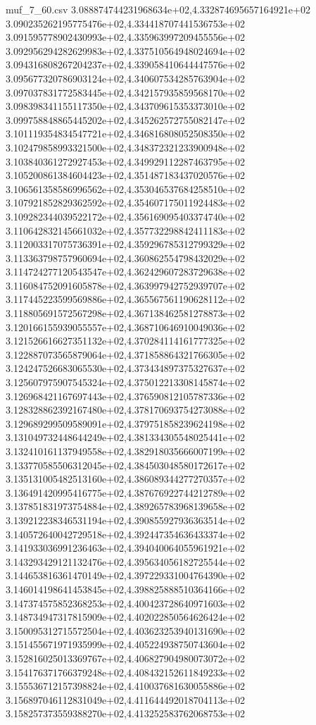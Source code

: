 \begin{filecontents*}{muf_7_60.csv}
3.088874744231968634e+02,4.332874695657164921e+02
3.090235262195775476e+02,4.334418707441536753e+02
3.091595778902430993e+02,4.335963997209455556e+02
3.092956294282629983e+02,4.337510564948024694e+02
3.094316808267204237e+02,4.339058410644447576e+02
3.095677320786903124e+02,4.340607534285763904e+02
3.097037831772583445e+02,4.342157935859568170e+02
3.098398341155117350e+02,4.343709615353373010e+02
3.099758848865445202e+02,4.345262572755082147e+02
3.101119354834547721e+02,4.346816808052508350e+02
3.102479858993321500e+02,4.348372321233900948e+02
3.103840361272927453e+02,4.349929112287463795e+02
3.105200861384604423e+02,4.351487183437020576e+02
3.106561358586996562e+02,4.353046537684258510e+02
3.107921852829362592e+02,4.354607175011924483e+02
3.109282344039522172e+02,4.356169095403374740e+02
3.110642832145661032e+02,4.357732298842411183e+02
3.112003317075736391e+02,4.359296785312799329e+02
3.113363798757960694e+02,4.360862554798432029e+02
3.114724277120543547e+02,4.362429607283729638e+02
3.116084752091605878e+02,4.363997942752939707e+02
3.117445223599569886e+02,4.365567561190628112e+02
3.118805691572567298e+02,4.367138462581278873e+02
3.120166155939055557e+02,4.368710646910049036e+02
3.121526616627351132e+02,4.370284114161777325e+02
3.122887073565879064e+02,4.371858864321766305e+02
3.124247526683065530e+02,4.373434897375327637e+02
3.125607975907545324e+02,4.375012213308145874e+02
3.126968421167697443e+02,4.376590812105787336e+02
3.128328862392167480e+02,4.378170693754273088e+02
3.129689299509589091e+02,4.379751858239624198e+02
3.131049732448644249e+02,4.381334305548025441e+02
3.132410161137949558e+02,4.382918035666007199e+02
3.133770585506312045e+02,4.384503048580172617e+02
3.135131005482513160e+02,4.386089344277270357e+02
3.136491420995416775e+02,4.387676922744212789e+02
3.137851831973754884e+02,4.389265783968139658e+02
3.139212238346531194e+02,4.390855927936363514e+02
3.140572640042729518e+02,4.392447354636433374e+02
3.141933036991236463e+02,4.394040064055961921e+02
3.143293429121132476e+02,4.395634056182725544e+02
3.144653816361470149e+02,4.397229331004764390e+02
3.146014198641453845e+02,4.398825888510364166e+02
3.147374575852368253e+02,4.400423728640971603e+02
3.148734947317815909e+02,4.402022850564626424e+02
3.150095312715572504e+02,4.403623253940131690e+02
3.151455671971935999e+02,4.405224938750743604e+02
3.152816025013369767e+02,4.406827904980073072e+02
3.154176371766379248e+02,4.408432152611849233e+02
3.155536712157398824e+02,4.410037681630055886e+02
3.156897046112831049e+02,4.411644492018704113e+02
3.158257373559388270e+02,4.413252583762068753e+02

\end{filecontents*}
